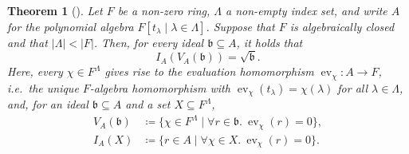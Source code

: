 \documentclass[11pt]{scrartcl}
\theoremstyle{definition}
\theoremstyle{plain}
\newtheorem{theorem}[definition]{Theorem}
\theoremstyle{remark}
\DeclareMathOperator{\ev}{ev}
\begin{document}
	\begin{theorem}[\textcite{Lang_1952}]\label{thm:zeidler}
		Let $F$ be a non-zero ring,
		$\Lambda$ a non-empty index set,
		and write $A$ for the polynomial algebra $F[t_\lambda \mid \lambda \in \Lambda]$.
		Suppose that $F$ is algebraically closed and that $|\Lambda| < |F|$.
		Then, for every ideal $\mathfrak{b} \subseteq A$, it holds that
		\[
			I_A (V_A(\mathfrak{b})) = \sqrt{\mathfrak{b}}.
		\]
		Here, every $\chi \in F^{\Lambda}$ gives rise to the evaluation homomorphism
		$\ev_{\chi} \colon A \to F$,
		i.e.\ the unique $F$-algebra homomorphism with $\ev_{\chi}(t_\lambda) = \chi(\lambda)$ for all $\lambda \in \Lambda$,
		and, for an ideal $\mathfrak{b} \subseteq A$ and a set $X \subseteq F^{\Lambda}$,
		\begin{align*}
			V_A(\mathfrak{b}) & \coloneqq \{\chi \in F^{\Lambda} \mid \forall r \in \mathfrak{b}.\ \ev_{\chi}(r) = 0 \},\\
			I_A(X) & \coloneqq \{r\in A \mid \forall \chi \in X.\ \ev_{\chi}(r) = 0\}.
		\end{align*}
	\end{theorem}
\end{document}
